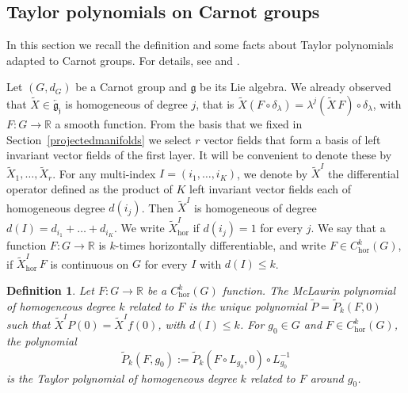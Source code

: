 \documentclass[12pt]{amsart}
\newtheorem{definition}{Definition}[section]
\begin{document}




\subsection{Taylor polynomials on Carnot groups}
In this section we recall the definition and some facts about Taylor polynomials adapted to Carnot groups. For details, see \cite{FollandStein} and \cite{Bonfiglioli}.

Let $(G,d_G)$ be a Carnot group and $\mathfrak g$ be its Lie algebra.
We already observed that  $\tilde X\in \overleftarrow{{\mathfrak{g_{j}}}}$ is homogeneous of degree $j$, that is  $\tilde X(F\circ \delta_\lambda)=\lambda^{j} (\tilde X \, F)\circ \delta_\lambda$, with $F:G\to \mathbb R$ a smooth function. From the basis that we fixed in Section~\ref{projectedmanifolds} we select $r$ vector fields that form a basis of left invariant vector fields of the first layer. It will be convenient to denote these by $\tilde X_1,\dots,\tilde X_r$.
For any multi-index
 $I=(i_1,\dots,i_K)$, we denote by 
 $\tilde X^I$ the differential operator defined as the product of $K$ left invariant vector fields each of homogeneous degree $d(i_j)$. Then $\tilde X^I$ is homogeneous of degree $d(I) = d_{i_1}+\dots+d_{i_K}$.
We write $\tilde X_{\mathrm{hor}}^I$ if $d({i_j})=1$ for every $j$.
   We say that a function $F:G\to \mathbb R$ is $k$-times horizontally differentiable, and write $F\in C^k_{\mathrm{hor}}(G)$, if $\tilde X_{\mathrm{hor}}^I \, F$ is continuous on $G$ for every $I$ with $d(I)\leq k$.

\begin{definition} Let 
     $F: G\to \mathbb R$ be a $C_{\mathrm{hor}}^k(G)$ function.
    The McLaurin polynomial of homogeneous degree $k$ related to $F$ is the unique polynomial $\tilde P=\tilde P_k(F,0)$ such that 
    $\tilde X^IP(0)=\tilde X^If(0)$, with $d(I)\leq k$.
  For  $g_0\in G$ and $F\in C_{\mathrm{hor}}^k(G)$,  the polynomial
  $$
  \tilde P_k(F,g_0):= \tilde P_k(F\circ L_{g_0},0)\circ L^{-1}_{g_0}
  $$
is the Taylor polynomial of homogeneous degree $k$ related to $F$ around $g_0$.
\end{definition}
\end{document}

